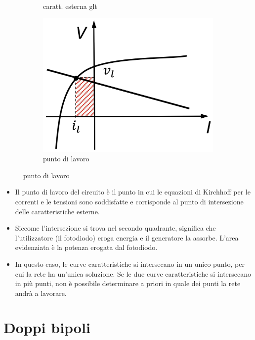 \documentclass[a4paper]{article}
\begin{document}
\begin{figure}[h]
\begin{minipage}{0.2\textwidth}
\begin{subfigure}[h]{0.8\textwidth}
			\caption*{caratt. esterna glt}
		\end{subfigure}
	\end{minipage}
	\begin{minipage}{0.2\textwidth}
		\begin{subfigure}[h]{0.9\textwidth}
			\includegraphics[width=\textwidth]{immagini/puntodilavoro.png}
			\caption*{punto di lavoro}
		\end{subfigure}
	\end{minipage}
\end{figure}
\begin{itemize}
	\item Il punto di lavoro del circuito è il punto in cui le equazioni di Kirchhoff per le correnti e le tensioni sono
	soddisfatte e corrisponde al punto di intersezione delle caratteristiche esterne.
	\item Siccome l'intersezione si trova nel secondo quadrante, significa che l'utilizzatore (il fotodiodo) eroga energia
	e il generatore la assorbe. L'area evidenziata è la potenza erogata dal fotodiodo.
	\item In questo caso, le curve caratteristiche si intersecano in un unico punto, per cui la rete ha un'unica soluzione.
	Se le due curve caratteristiche si intersecano in più punti, non è possibile determinare a priori in quale dei punti
	la rete andrà a lavorare.
\end{itemize}

\newpage

\section{Doppi bipoli}
\end{document}
